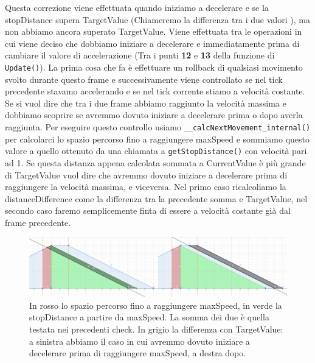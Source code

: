 \documentclass[main.tex]{subfiles}
\begin{document}
Questa correzione viene effettuata quando iniziamo a decelerare e se la stopDistance supera TargetValue (Chiameremo la differenza tra i due valori ), ma non abbiamo ancora superato TargetValue. Viene effettuata tra le operazioni in cui viene deciso che dobbiamo iniziare a decelerare e immediatamente prima di cambiare il valore di accelerazione (Tra i punti \textbf{12} e \textbf{13} della funzione di \lstinline{Update()}). La prima cosa che fa è effettuare un rollback di qualsiasi movimento svolto durante questo frame e successivamente viene controllato se nel tick precedente stavamo accelerando e se nel tick corrente stiamo a velocità costante. Se si vuol dire che tra i due frame abbiamo raggiunto la velocità massima e dobbiamo scoprire se avremmo dovuto iniziare a decelerare prima o dopo averla raggiunta. Per eseguire questo controllo usiamo \lstinline{__calcNextMovement_internal()} per calcolarci lo spazio percorso fino a raggiungere maxSpeed e sommiamo questo valore a quello ottenuto da una chiamata a \lstinline{getStopDistance()} con velocità pari ad 1. Se questa distanza appena calcolata sommata a CurrentValue è più grande di TargetValue vuol dire che avremmo dovuto iniziare a decelerare prima di raggiungere la velocità massima, e viceversa. Nel primo caso ricalcoliamo la distanceDifference come la differenza tra la precedente somma e TargetValue, nel secondo caso faremo semplicemente finta di essere a velocità costante già dal frame precedente.
\begin{figure}[H]
    \centering
    \includegraphics[width=1\linewidth]{img/interpolazione/compensateLateCall3Case.png}
    \caption{In rosso lo spazio percorso fino a raggiungere maxSpeed, in verde la stopDistance a partire da maxSpeed. La somma dei due è quella testata nei precedenti check. In grigio la differenza con TargetValue: a sinistra abbiamo il caso in cui avremmo dovuto iniziare a decelerare prima di raggiungere maxSpeed, a destra dopo.}
    \label{fig:4_compensateLateCall3Case}
\end{figure}
\end{document}
